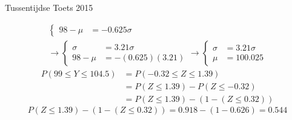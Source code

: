 \documentclass[main.tex]{subfiles}
\begin{document}
\begin{examenvraag}{Tussentijdse Toets 2015}
\begin{ex-antwoord}
\begin{align*}
\begin{cases}
        98-\mu
        &= -0.625\sigma
      \end{cases}\\
      \longrightarrow
      \begin{cases}
        \sigma
        &= 3.21\sigma\\
        98-\mu
        &= -(0.625)(3.21)
      \end{cases}
      \longrightarrow
      \begin{cases}
        \sigma
        &= 3.21\sigma\\
        \mu
        &= 100.025
      \end{cases}
    \end{align*}
    \begin{align*}
      P(99 \le Y \le 104.5)
      &= P(-0.32 \le Z \le 1.39)\\
      &= P(Z \le 1.39) - P(Z \le -0.32)\\
      &= P(Z \le 1.39) - (1-(Z \le 0.32))
    \end{align*}
    \[ P(Z \le 1.39) - (1-(Z \le 0.32)) = 0.918 - (1-0.626) = 0.544\]
  \end{ex-antwoord}
\end{examenvraag}
\end{document}
